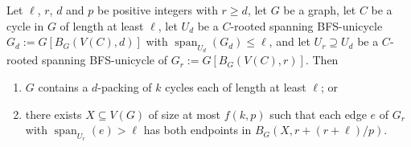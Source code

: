 \documentclass{patmorin}
\DeclareMathOperator{\spn}{span}
\begin{document}
\begin{lem}
  Let $\ell$, $r$, $d$ and $p$ be positive integers with $r\ge d$, let $G$ be a graph, let $C$ be a cycle in $G$ of length at least $\ell$, let $U_d$ be a $C$-rooted spanning BFS-unicycle $G_d:=G[B_G(V(C),d)]$ with $\spn_{U_d}(G_d)\le\ell$, and let $U_r\supseteq U_d$ be a $C$-rooted spanning BFS-unicycle of $G_r:=G[B_G(V(C),r)]$. Then
  \begin{enumerate}[nosep,nolistsep,label=\rm(\alph*),ref=(\alph*)]
    \item\label{packing_blowup} $G$ contains a $d$-packing of $k$ cycles each of length at least $\ell$; or

    \item\label{hitting} there exists $X\subseteq V(G)$ of size at most $f(k,p)$ such that each edge $e$ of $G_r$ with $\spn_{U_r}(e)>\ell$ has both endpoints in $B_G(X,r+(r+\ell)/p)$.
  \end{enumerate}
\end{lem}
\end{document}
